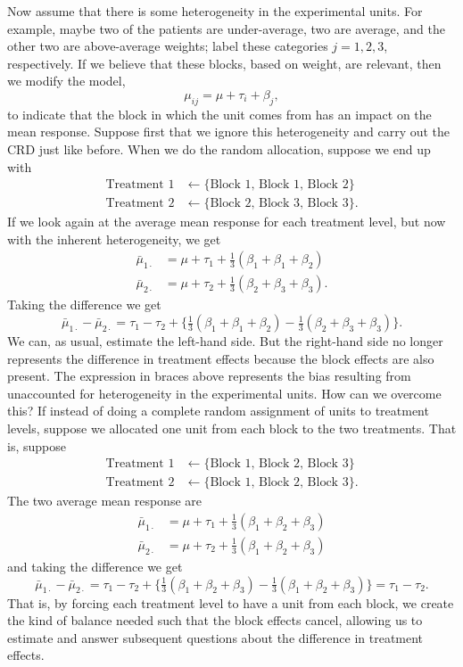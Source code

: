 \documentclass[a4paper, 12pt]{article}
\theoremstyle{plain}
\theoremstyle{definition}
\theoremstyle{remark}
\begin{document}
Now assume that there is some heterogeneity in the experimental units.  For example, maybe two of the patients are under-average, two are average, and the other two are above-average weights; label these categories $j=1,2,3$, respectively.  If we believe that these blocks, based on weight, are relevant, then we modify the model, 
\[ \mu_{ij} = \mu + \tau_i + \beta_j, \]
to indicate that the block in which the unit comes from has an impact on the mean response.  Suppose first that we ignore this heterogeneity and carry out the CRD just like before.  When we do the random allocation, suppose we end up with 
\begin{align*}
\text{Treatment 1} & \gets \{\text{Block 1, Block 1, Block 2}\} \\
\text{Treatment 2} & \gets \{\text{Block 2, Block 3, Block 3}\}. 
\end{align*}
If we look again at the average mean response for each treatment level, but now with the inherent heterogeneity, we get 
\begin{align*}
\bar\mu_{1\cdot} & = \mu + \tau_1 + \tfrac13(\beta_1 + \beta_1 + \beta_2) \\
\bar\mu_{2\cdot} & = \mu + \tau_2 + \tfrac13(\beta_2 + \beta_3 + \beta_3). 
\end{align*}
Taking the difference we get 
\[ \bar\mu_{1\cdot} - \bar\mu_{2\cdot} = \tau_1 - \tau_2 + \{\tfrac13(\beta_1 + \beta_1 + \beta_2) - \tfrac13 (\beta_2 + \beta_3 + \beta_3)\}. \]
We can, as usual, estimate the left-hand side.  But the right-hand side no longer represents the difference in treatment effects because the block effects are also present.  The expression in braces above represents the bias resulting from unaccounted for heterogeneity in the experimental units.  How can we overcome this?  If instead of doing a complete random assignment of units to treatment levels, suppose we allocated one unit from each block to the two treatments.  That is, suppose 
\begin{align*}
\text{Treatment 1} & \gets \{\text{Block 1, Block 2, Block 3}\} \\
\text{Treatment 2} & \gets \{\text{Block 1, Block 2, Block 3}\}. 
\end{align*}
The two average mean response are 
\begin{align*}
\bar\mu_{1\cdot} & = \mu + \tau_1 + \tfrac13(\beta_1 + \beta_2 + \beta_3) \\
\bar\mu_{2\cdot} & = \mu + \tau_2 + \tfrac13(\beta_1 + \beta_2 + \beta_3) 
\end{align*}
and taking the difference we get 
\[ \bar\mu_{1\cdot} - \bar\mu_{2\cdot} = \tau_1 - \tau_2 + \{\tfrac13(\beta_1 + \beta_2+ \beta_3) - \tfrac13 (\beta_1 + \beta_2 + \beta_3)\} = \tau_1 - \tau_2. \]
That is, by forcing each treatment level to have a unit from each block, we create the kind of balance needed such that the block effects cancel, allowing us to estimate and answer subsequent questions about the difference in treatment effects.  
\end{document}
